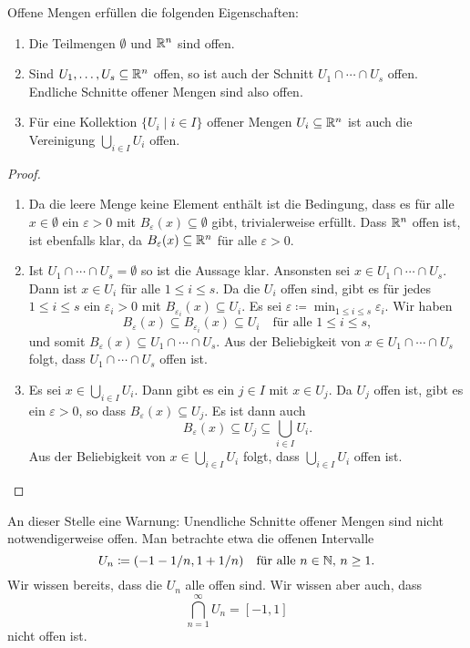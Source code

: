 \documentclass[a4paper,10pt]{article}
\begin{document}
\begin{lem}\label{lem: Eigenschaften von offenen Mengen}
 Offene Mengen erfüllen die folgenden Eigenschaften:
 \begin{enumerate}
  \item
   Die Teilmengen $\emptyset$ und $\mathbb{R}^n$ sind offen.
  \item
   Sind $U_1, \dotsc, U_s \subseteq \mathbb{R}^n$ offen, so ist auch der Schnitt $U_1 \cap \dotsb \cap U_s$ offen. Endliche Schnitte offener Mengen sind also offen.
  \item
   Für eine Kollektion $\{U_i \mid i \in I\}$ offener Mengen $U_i \subseteq \mathbb{R}^n$ ist auch die Vereinigung $\bigcup_{i \in I} U_i$ offen.
 \end{enumerate}
\end{lem}
\begin{proof}
 \begin{enumerate}
  \item
   Da die leere Menge keine Element enthält ist die Bedingung, dass es für alle $x \in \emptyset$ ein $\varepsilon > 0$ mit $B_\varepsilon(x) \subseteq \emptyset$ gibt, trivialerweise erfüllt. Dass $\mathbb{R}^n$ offen ist, ist ebenfalls klar, da $B_\varepsilon(x) \subseteq \mathbb{R}^n$ für alle $\varepsilon > 0$.
  \item
   Ist $U_1 \cap \dotsb \cap U_s = \emptyset$ so ist die Aussage klar. Ansonsten sei $x \in U_1 \cap \dotsb \cap U_s$. Dann ist $x \in U_i$ für alle $1 \leq i \leq s$. Da die $U_i$ offen sind, gibt es für jedes $1 \leq i \leq s$ ein $\varepsilon_i > 0$ mit $B_{\varepsilon_i}(x) \subseteq U_i$. Es sei $\varepsilon \coloneqq \min_{1 \leq i \leq s} \varepsilon_i$. Wir haben
   \[
    B_\varepsilon(x) \subseteq B_{\varepsilon_i}(x) \subseteq U_i
    \quad
    \text{für alle $1 \leq i \leq s$},
   \]
   und somit $B_\varepsilon(x) \subseteq U_1 \cap \dotsb \cap U_s$. Aus der Beliebigkeit von $x \in U_1 \cap \dotsb \cap U_s$ folgt, dass $U_1 \cap \dotsb \cap U_s$ offen ist.
  \item
   Es sei $x \in \bigcup_{i \in I} U_i$. Dann gibt es ein $j \in I$ mit $x \in U_j$. Da $U_j$ offen ist, gibt es ein $\varepsilon > 0$, so dass $B_\varepsilon(x) \subseteq U_j$. Es ist dann auch
   \[
    B_\varepsilon(x) \subseteq U_j \subseteq \bigcup_{i \in I} U_i.
   \]
   Aus der Beliebigkeit von $x \in \bigcup_{i \in I} U_i$ folgt, dass $\bigcup_{i \in I} U_i$ offen ist.
  \qedhere
 \end{enumerate}
\end{proof}


An dieser Stelle eine Warnung: Unendliche Schnitte offener Mengen sind nicht notwendigerweise offen. Man betrachte etwa die offenen Intervalle
\[
 U_n \coloneqq (-1-1/n, 1+1/n)  \quad \text{für alle $n \in \mathbb{N}$, $n \geq 1$}.
\]
Wir wissen bereits, dass die $U_n$ alle offen sind. Wir wissen aber auch, dass
\[
 \bigcap_{n=1}^\infty U_n = [-1,1]
\]
nicht offen ist.
\end{document}
